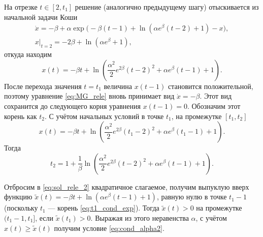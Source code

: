 %
%
%

На отрезке $t \in [2, t_1]$ решение (аналогично предыдущему шагу) отыскивается из начальной задачи Коши 
%
\begin{multline}
    \dot{x} = -\beta + \alpha\exp\bigg(-\beta(t - 1) + \ln(\alpha e^{\beta}(t - 2) + 1) - x\bigg),\\
    x|_{t = 2} = - 2 \beta + \ln(\alpha e^{\beta} + 1),
\end{multline}
%
откуда находим
\begin{equation}
	\label{eq:sol_rele_2}
    x(t) = -\beta t + \ln\left(\frac{\alpha^2}{2}e^{2\beta}(t - 2)^2+\alpha e^{\beta}(t - 1) + 1\right).
\end{equation}
%
После перехода значения $t = t_1$ величина $x(t - 1)$ становится положительной, поэтому уравнение \eqref{eq:MG_rele} вновь принимает вид $\dot{x} = -\beta$. Этот вид сохранится до следующего корня уравнения $x(t - 1) = 0$. Обозначим этот корень как $t_2$. С учётом начальных условий в точке $t_1$, на промежутке $[t_1, t_2]$
\begin{equation}
	\label{eq:sol_rele_3}
	x(t) = -\beta t + \ln\left(\frac{\alpha^2}{2}e^{2\beta}(t_1 - 2)^2 + \alpha e^{\beta}(t_1 - 1) + 1\right).
\end{equation}
%
Тогда
\begin{equation}
\label{eq:t2}
t_2 = 1 + \dfrac{1}{\beta}\ln\left(\frac{\alpha^2}{2}e^{2\beta}(t - 2)^2 + \alpha e^{\beta}(t - 1) + 1\right).
\end{equation}

Отбросим в \eqref{eq:sol_rele_2} квадратичное слагаемое, получим выпуклую вверх функцию $\tilde{x}(t) = -\beta t + \ln(\alpha e^{\beta} (t - 1) + 1)$, равную нулю в точке $t_1 - 1$ (поскольку $t_1$ --- корень \eqref{eq:t1_cond_exp}). Тогда $\tilde{x}(t) > 0$ на промежутке $(t_1 - 1, t_1]$, если $\tilde{x}(t_1) > 0$. Выражая из этого неравенства $\alpha$, с учётом $x(t) \geqslant \tilde{x}(t)$ получим условие \eqref{eq:cond_alpha2}.

